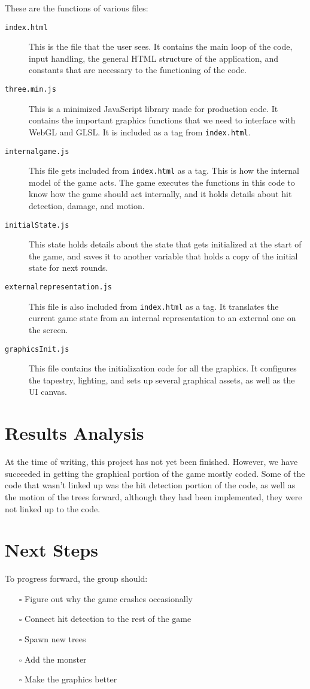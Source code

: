 \documentclass[11pt]{article}
\begin{document}
These are the functions of various files:
\begin{description}
\item[{\texttt{index.html}}] This is the file that the user sees. It contains the main loop
of the code, input handling, the general HTML structure of the application,
and constants that are necessary to the functioning of the code.
\item[{\texttt{three.min.js}}] This is a minimized JavaScript library made for production
code. It contains the important graphics functions that we need to interface
with WebGL and GLSL. It is included as a tag from \texttt{index.html}.
\item[{\texttt{internalgame.js}}] This file gets included from \texttt{index.html} as a tag.
This is how the internal model of the game acts. The game executes the
functions in this code to know how the game should act internally, and
it holds details about hit detection, damage, and motion.
\item[{\texttt{initialState.js}}] This state holds details about the state that gets
initialized at the start of the game, and saves it to another variable that
holds a copy of the initial state for next rounds.
\item[{\texttt{externalrepresentation.js}}] This file is also included from \texttt{index.html} as
a tag. It translates the current game state from an internal representation to
an external one on the screen.
\item[{\texttt{graphicsInit.js}}] This file contains the initialization code for all the
graphics. It configures the tapestry, lighting, and sets up several graphical
assets, as well as the UI canvas.
\end{description}
\section{Results Analysis}
\label{sec:orgd7d20c9}
At the time of writing, this project has not yet been finished. However,
we have succeeded in getting the graphical portion of the game mostly
coded. Some of the code that wasn't linked up was the hit detection portion
of the code, as well as the motion of the trees forward, although they had
been implemented, they were not linked up to the code.
\section{Next Steps}
\label{sec:org9abee52}
To progress forward, the group should:
\begin{itemize}
\item[{$\square$}] Figure out why the game crashes occasionally
\item[{$\square$}] Connect hit detection to the rest of the game
\item[{$\square$}] Spawn new trees
\item[{$\square$}] Add the monster
\item[{$\square$}] Make the graphics better
\end{itemize}
\end{document}

